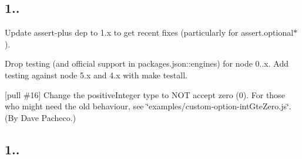 \subsection*{1..}


\begin{DoxyItemize}
\item Update assert-\/plus dep to 1.\+x to get recent fixes (particularly for {\ttfamily assert.\+optional$\ast$}).
\item Drop testing (and official support in packages.\+json\+::engines) for node 0..\+x. Add testing against node 5.\+x and 4.\+x with {\ttfamily make testall}.
\item \mbox{[}pull \#16\mbox{]} Change the {\ttfamily positive\+Integer} type to N\+OT accept zero (0). For those who might need the old behaviour, see \char`\"{}examples/custom-\/option-\/int\+Gte\+Zero.\+js\char`\"{}. (By Dave Pacheco.)
\end{DoxyItemize}

\subsection*{1..}



